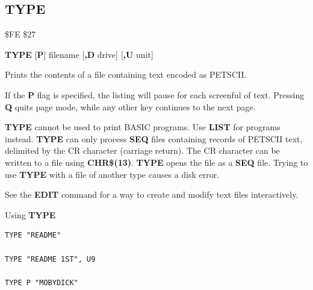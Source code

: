 \subsection{TYPE}
\begin{description}[leftmargin=2cm,style=nextline]
\item [Token:]    \$FE \$27

\item [Format:]   {\bf TYPE} [{\bf P}] filename [{\bf,D} drive] [{\bf,U} unit]

\item [Usage:]    Prints the contents of a file containing text encoded as PETSCII.

                  If the {\bf P} flag is specified, the listing will pause for each screenful of text. Pressing {\bf Q} quits page mode, while any other key continues to the next page.

                  \filenamedefinition

                  \drivedefinition

                  \unitdefinition

\item [Remarks:]  {\bf TYPE} cannot be used to print BASIC programs. Use {\bf LIST} for programs instead. {\bf TYPE} can only process {\bf SEQ} files containing records of PETSCII text, delimited by the CR character (carriage return). The CR character can be written to a file using {\bf CHR\$(13)}. {\bf TYPE} opens the file as a {\bf SEQ} file. Trying to use {\bf TYPE} with a file of another type causes a  disk error.

                  See the {\bf EDIT} command for a way to create and modify text files interactively.

\item [Examples:] Using {\bf TYPE}

\begin{tcolorbox}[colback=black,coltext=white]
\verbatimfont{\codefont}
\begin{verbatim}
TYPE "README"

TYPE "README 1ST", U9

TYPE P "MOBYDICK"
\end{verbatim}
\end{tcolorbox}
\end{description}


\newpage
